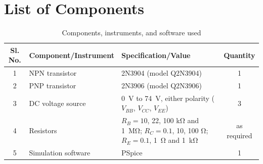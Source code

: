 \documentclass[12pt,a4paper]{article}
\begin{document}
	\section{List of Components}
	\begin{table}[H]
		\centering
		\caption{Components, instruments, and software used}
		\label{tab:components}
		\renewcommand{\arraystretch}{1.25}
		\begin{tabular}{|c|l|>{\raggedright\arraybackslash}p{}|c|}
			\hline
			\textbf{Sl. No.} & \textbf{Component/Instrument} & \textbf{Specification/Value} & \textbf{Quantity} \\
			\hline
			1 & NPN transistor & 2N3904 (model Q2N3904) \cite{ref:2n3904} & 1 \\
			\hline
			2 & PNP transistor & 2N3906 (model Q2N3906) \cite{ref:2n3906} & 1 \\
			\hline
			3 & DC voltage source & \SI{0}{\volt} to \SI{74}{\volt}, either polarity ($V_{BB}$, $V_{CC}$, $V_{EE}$) & 3 \\
			\hline
			4 & Resistors & $R_B = 10$, 22, 100 \si{\kilo\ohm} and \SI{1}{\mega\ohm}; $R_C = 0.1$, 10, 100 \si{\ohm}; $R_E = 0.1$, \SI{1}{\ohm} and \SI{1}{\kilo\ohm} & as required \\
			\hline
			5 & Simulation software & PSpice & 1 \\
			\hline
		\end{tabular}
	\end{table}

\end{document}
